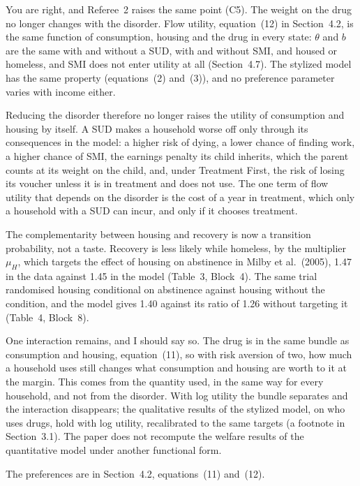 \documentclass[11pt]{article}
\begin{document}
\begin{response}
\concede You are right, and Referee~2 raises the same point (C5). The weight on the
drug no longer changes with the disorder. Flow utility, equation~(12) in Section~4.2,
is the same function of consumption, housing and the drug in every state: $\theta$ and
$b$ are the same with and without a SUD, with and without SMI, and housed or homeless,
and SMI does not enter utility at all (Section~4.7). The stylized model has the same
property (equations~(2) and~(3)), and no preference parameter varies with income
either.

Reducing the disorder therefore no longer raises the utility of consumption and
housing by itself. A SUD makes a household worse off only through its consequences in
the model: a higher risk of dying, a lower chance of finding work, a higher chance of
SMI, the earnings penalty its child inherits, which the parent counts at its weight on
the child, and, under Treatment First, the risk of losing its voucher unless it is in
treatment and does not use. The one term of flow utility that depends on the disorder
is the cost of a year in treatment, which only a household with a SUD can incur, and
only if it chooses treatment.

The complementarity between housing and recovery is now a transition probability, not
a taste. Recovery is less likely while homeless, by the multiplier $\mu_H$, which
targets the effect of housing on abstinence in Milby et al.\ (2005), 1.47 in the data
against 1.45 in the model (Table~3, Block~4). The same trial randomised housing
conditional on abstinence against housing without the condition, and the model gives
1.40 against its ratio of 1.26 without targeting it (Table~4, Block~8).

One interaction remains, and I should say so. The drug is in the same bundle as
consumption and housing, equation~(11), so with risk aversion of two, how much a
household uses still changes what consumption and housing are worth to it at the
margin. This comes from the quantity used, in the same way for every household, and not
from the disorder. With log utility the bundle separates and the interaction
disappears; the qualitative results of the stylized model, on who uses drugs, hold with
log utility, recalibrated to the same targets (a footnote in Section~3.1). \open The
paper does not recompute the welfare results of the quantitative model under another
functional form.

The preferences are in Section~4.2, equations~(11) and~(12).
\end{response}
\end{document}
